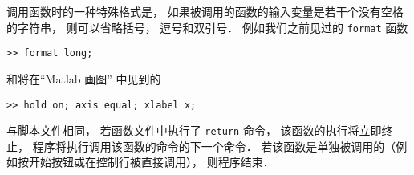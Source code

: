 调用函数时的一种特殊格式是， 如果被调用的函数的输入变量是若干个没有空格的字符串， 则可以省略括号， 逗号和双引号． 例如我们之前见过的 \verb|format| 函数
\begin{lstlisting}[language=matlabC]
>> format long;
\end{lstlisting}
和将在“Matlab 画图” 中见到的
\begin{lstlisting}[language=matlabC]
>> hold on; axis equal; xlabel x;
\end{lstlisting}

与脚本文件相同， 若函数文件中执行了 \verb|return| 命令， 该函数的执行将立即终止， 程序将执行调用该函数的命令的下一个命令． 若该函数是单独被调用的（例如按开始按钮或在控制行被直接调用）， 则程序结束．
